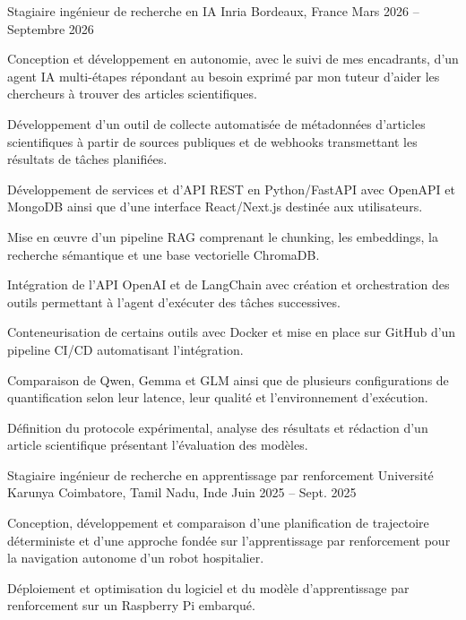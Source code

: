 
\begin{cventries}
  \cventry
    {Stagiaire ingénieur de recherche en IA}
    {Inria}
    {Bordeaux, France}
    {Mars 2026 -- Septembre 2026}
    {
      \begin{cvitems}
        \item {Conception et développement en autonomie, avec le suivi de mes encadrants, d’un agent IA multi-étapes répondant au besoin exprimé par mon tuteur d’aider les chercheurs à trouver des articles scientifiques.}
        \item {Développement d’un outil de collecte automatisée de métadonnées d’articles scientifiques à partir de sources publiques et de webhooks transmettant les résultats de tâches planifiées.}
        \item {Développement de services et d’API REST en Python/FastAPI avec OpenAPI et MongoDB ainsi que d’une interface React/Next.js destinée aux utilisateurs.}
        \item {Mise en œuvre d’un pipeline RAG comprenant le chunking, les embeddings, la recherche sémantique et une base vectorielle ChromaDB.}
        \item {Intégration de l’API OpenAI et de LangChain avec création et orchestration des outils permettant à l’agent d’exécuter des tâches successives.}
        \item {Conteneurisation de certains outils avec Docker et mise en place sur GitHub d’un pipeline CI/CD automatisant l’intégration.}
        \item {Comparaison de Qwen, Gemma et GLM ainsi que de plusieurs configurations de quantification selon leur latence, leur qualité et l’environnement d’exécution.}
        \item {Définition du protocole expérimental, analyse des résultats et rédaction d’un article scientifique présentant l’évaluation des modèles.}
      \end{cvitems}
    }

  \cventry
    {Stagiaire ingénieur de recherche en apprentissage par renforcement}
    {Université Karunya}
    {Coimbatore, Tamil Nadu, Inde}
    {Juin 2025 -- Sept. 2025}
    {
      \begin{cvitems}
        \item {Conception, développement et comparaison d’une planification de trajectoire déterministe et d’une approche fondée sur l’apprentissage par renforcement pour la navigation autonome d’un robot hospitalier.}
        \item {Déploiement et optimisation du logiciel et du modèle d’apprentissage par renforcement sur un Raspberry Pi embarqué.}
      \end{cvitems}
    }
\end{cventries}
